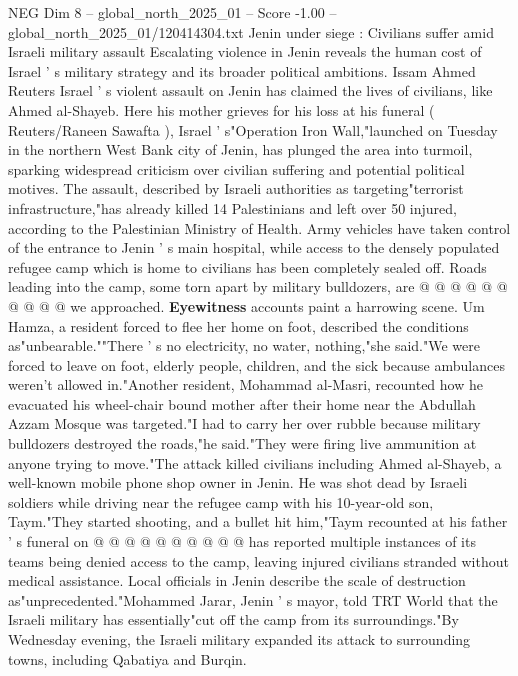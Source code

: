 \begin{textsample}{NEG Dim 8 – global\_north\_2025\_01 – Score -1.00 – global\_north\_2025\_01/120414304.txt}  \label{ex:f8_neg_165}
Jenin under siege : Civilians suffer amid Israeli military assault Escalating violence in Jenin reveals the human cost of Israel ' s military strategy and its broader political ambitions.
Issam Ahmed Reuters Israel ' s violent assault on Jenin has claimed the lives of civilians, like Ahmed al-Shayeb.
Here his mother grieves for his loss at his funeral ( Reuters/Raneen Sawafta ), Israel ' s"Operation Iron Wall,"launched on Tuesday in the northern West Bank city of Jenin, has plunged the area into turmoil, sparking widespread criticism over civilian suffering and potential political motives.
The assault, described by Israeli authorities as targeting"terrorist infrastructure,"has already killed 14 Palestinians and left over 50 injured, according to the Palestinian Ministry of Health.
Army vehicles have taken control of the entrance to Jenin ' s main hospital, while access to the densely populated refugee camp which is home to civilians has been completely sealed off.
Roads leading into the camp, some torn apart by military bulldozers, are @ @ @ @ @ @ @ @ @ @ we approached. \textbf{Eyewitness} accounts paint a harrowing scene.
Um Hamza, a resident forced to flee her home on foot, described the conditions as"unbearable.""There ' s no electricity, no water, nothing,"she said."We were forced to leave on foot, elderly people, children, and the sick because ambulances weren't allowed in."Another resident, Mohammad al-Masri, recounted how he evacuated his wheel-chair bound mother after their home near the Abdullah Azzam Mosque was targeted."I had to carry her over rubble because military bulldozers destroyed the roads,"he said."They were firing live ammunition at anyone trying to move."The attack killed civilians including Ahmed al-Shayeb, a well-known mobile phone shop owner in Jenin.
He was shot dead by Israeli soldiers while driving near the refugee camp with his 10-year-old son, Taym."They started shooting, and a bullet hit him,"Taym recounted at his father ' s funeral on @ @ @ @ @ @ @ @ @ @ has reported multiple instances of its teams being denied access to the camp, leaving injured civilians stranded without medical assistance.
Local officials in Jenin describe the scale of destruction as"unprecedented."Mohammed Jarar, Jenin ' s mayor, told TRT World that the Israeli military has essentially"cut off the camp from its surroundings."By Wednesday evening, the Israeli military expanded its attack to surrounding towns, including Qabatiya and Burqin.

\end{textsample}

